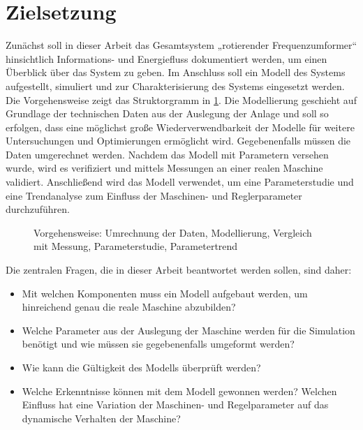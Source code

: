\section{Zielsetzung}
\label{sec:Zielsetzung}
Zunächst soll in dieser Arbeit das Gesamtsystem „rotierender Frequenzumformer“ hinsichtlich Informations- und Energiefluss dokumentiert werden, um einen Überblick über das System zu geben. Im Anschluss soll ein Modell des Systems aufgestellt, simuliert und zur Charakterisierung des Systems eingesetzt werden. Die Vorgehensweise zeigt das Struktorgramm in \cref{fig:StrukturArbeit}.   Die Modellierung geschieht auf Grundlage der technischen Daten aus der Auslegung der Anlage und soll so erfolgen, dass eine möglichst große Wiederverwendbarkeit der Modelle für weitere Untersuchungen und Optimierungen ermöglicht wird.  Gegebenenfalls müssen die Daten umgerechnet werden. Nachdem das Modell mit Parametern versehen wurde, wird es verifiziert und mittels Messungen an einer realen Maschine validiert. Anschließend wird das Modell verwendet, um eine Parameterstudie und eine Trendanalyse zum Einfluss der Maschinen- und Reglerparameter durchzuführen. 
\begin{figure}
	\centering
	
	\caption{Vorgehensweise: Umrechnung der Daten, Modellierung, Vergleich mit Messung, Parameterstudie, Parametertrend}
	\label{fig:StrukturArbeit}
\end{figure}
Die zentralen Fragen, die in dieser Arbeit beantwortet werden sollen, sind daher:
\begin{itemize}
\item Mit welchen Komponenten muss ein Modell aufgebaut werden, um hinreichend genau die reale Maschine abzubilden?
\item Welche Parameter aus der Auslegung der Maschine werden für die Simulation benötigt und wie müssen sie gegebenenfalls umgeformt werden?
\item Wie kann die Gültigkeit des Modells überprüft werden?
\item Welche Erkenntnisse können mit dem Modell gewonnen werden? Welchen Einfluss hat eine Variation der Maschinen- und Regelparameter auf das dynamische Verhalten der Maschine?
\end{itemize}

